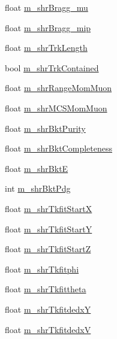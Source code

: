 \begin{DoxyCompactItemize}
float \hyperlink{classselection_1_1CCincSelection_abe0da2d66394a9583d9540f83a114901}{m\-\_\-shr\-Bragg\-\_\-mu}
\item 
float \hyperlink{classselection_1_1CCincSelection_a0d588b58345d52cc13a398bb3f6ff2fd}{m\-\_\-shr\-Bragg\-\_\-mip}
\item 
float \hyperlink{classselection_1_1CCincSelection_a09db29c4170084b4c366defeb3330de8}{m\-\_\-shr\-Trk\-Length}
\item 
bool \hyperlink{classselection_1_1CCincSelection_a5cde5d5c0d798594d11f082dadaf52bc}{m\-\_\-shr\-Trk\-Contained}
\item 
float \hyperlink{classselection_1_1CCincSelection_a5dff6f4a03bc26649697adbd38241be3}{m\-\_\-shr\-Range\-Mom\-Muon}
\item 
float \hyperlink{classselection_1_1CCincSelection_a752b664543c799d4afd1ee195091ff1c}{m\-\_\-shr\-M\-C\-S\-Mom\-Muon}
\item 
float \hyperlink{classselection_1_1CCincSelection_a95079e8ae0cb7d55594d64812d24327c}{m\-\_\-shr\-Bkt\-Purity}
\item 
float \hyperlink{classselection_1_1CCincSelection_ae50845633aef1725ac8c894101041f54}{m\-\_\-shr\-Bkt\-Completeness}
\item 
float \hyperlink{classselection_1_1CCincSelection_a0a43f7b976987cc6d13389a589c561e2}{m\-\_\-shr\-Bkt\-E}
\item 
int \hyperlink{classselection_1_1CCincSelection_aa11fee829a174ef4b6f92041edb990cf}{m\-\_\-shr\-Bkt\-Pdg}
\item 
float \hyperlink{classselection_1_1CCincSelection_a0bab1ed8cdf12861136bd47a6d48c7ad}{m\-\_\-shr\-Tkfit\-Start\-X}
\item 
float \hyperlink{classselection_1_1CCincSelection_aeff05af138a16a516e5413e21b6bcdf1}{m\-\_\-shr\-Tkfit\-Start\-Y}
\item 
float \hyperlink{classselection_1_1CCincSelection_a9c1c8138a2febe952478d15845ca8846}{m\-\_\-shr\-Tkfit\-Start\-Z}
\item 
float \hyperlink{classselection_1_1CCincSelection_af760bcbc586c53183f9ed2d5359b028a}{m\-\_\-shr\-Tkfitphi}
\item 
float \hyperlink{classselection_1_1CCincSelection_a9fa1d825a900a4081323091daa9b0aa7}{m\-\_\-shr\-Tkfittheta}
\item 
float \hyperlink{classselection_1_1CCincSelection_aa619cb73a3bb42251eaf5b35445e788b}{m\-\_\-shr\-Tkfitdedx\-Y}
\item 
float \hyperlink{classselection_1_1CCincSelection_afd1502883efc2504917a3b17eeb4aa46}{m\-\_\-shr\-Tkfitdedx\-V}

\end{DoxyCompactItemize}
